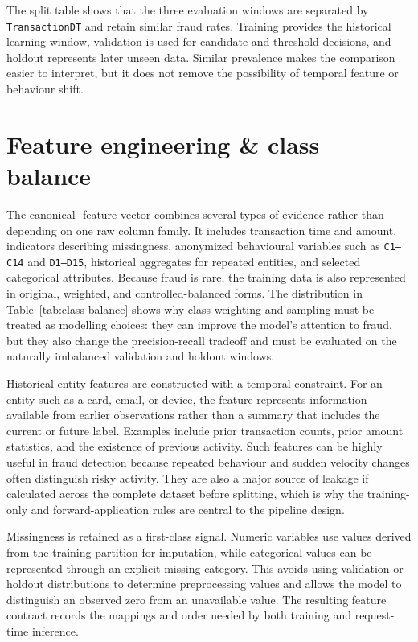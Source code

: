 The split table shows that the three evaluation windows are separated by
\texttt{TransactionDT} and retain similar fraud rates. Training provides the
historical learning window, validation is used for candidate and threshold
decisions, and holdout represents later unseen data. Similar prevalence makes
the comparison easier to interpret, but it does not remove the possibility of
temporal feature or behaviour shift.

\section{Feature engineering \& class balance}

The canonical -feature vector combines several types of evidence rather than depending on one raw column family. It includes transaction time and amount, indicators describing missingness, anonymized behavioural variables such as \texttt{C1--C14} and \texttt{D1--D15}, historical aggregates for repeated entities, and selected categorical attributes. Because fraud is rare, the training data is also represented in original, weighted, and controlled-balanced forms. The distribution in Table~\ref{tab:class-balance} shows why class weighting and sampling must be treated as modelling choices: they can improve the model's attention to fraud, but they also change the precision-recall tradeoff and must be evaluated on the naturally imbalanced validation and holdout windows.

Historical entity features are constructed with a temporal constraint. For an
entity such as a card, email, or device, the feature represents information
available from earlier observations rather than a summary that includes the
current or future label. Examples include prior transaction counts, prior
amount statistics, and the existence of previous activity. Such features can
be highly useful in fraud detection because repeated behaviour and sudden
velocity changes often distinguish risky activity. They are also a major
source of leakage if calculated across the complete dataset before splitting,
which is why the training-only and forward-application rules are central to the
pipeline design.

Missingness is retained as a first-class signal. Numeric variables use values
derived from the training partition for imputation, while categorical values
can be represented through an explicit missing category. This avoids using
validation or holdout distributions to determine preprocessing values and
allows the model to distinguish an observed zero from an unavailable value.
The resulting feature contract records the mappings and order needed by both
training and request-time inference.

